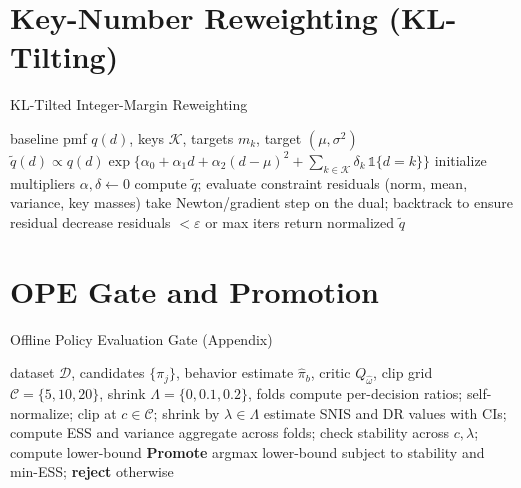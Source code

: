 \section{Key-Number Reweighting (KL-Tilting)}
\begin{algorithm}[H]
  \caption{KL-Tilted Integer-Margin Reweighting}
  \label{alg:kl-tilt}
  \begin{algorithmic}[1]
    \Require baseline pmf $q(d)$, keys $\mathcal K$, targets $m_k$, target $(\mu,\sigma^2)$
    \Ensure $\tilde q(d) \propto q(d)\exp\{\alpha_0+\alpha_1 d+\alpha_2 (d-\mu)^2+\sum_{k\in\mathcal K}\delta_k\,\mathbb{1}\{d=k\}\}$
    \State initialize multipliers $\alpha,\delta \leftarrow 0$
    \Repeat
      \State compute $\tilde q$; evaluate constraint residuals (norm, mean, variance, key masses)
      \State take Newton/gradient step on the dual; backtrack to ensure residual decrease
    \Until residuals $< \varepsilon$ or max iters
    \State return normalized $\tilde q$
  \end{algorithmic}
\end{algorithm}

\section{OPE Gate and Promotion}
\begin{algorithm}[H]
  \caption{Offline Policy Evaluation Gate (Appendix)}
  \label{alg:ope-gate-appendix}
  \begin{algorithmic}[1]
    \Require dataset $\mathcal D$, candidates $\{\pi_j\}$, behavior estimate $\hat\pi_b$, critic $Q_{\hat\omega}$, clip grid $\mathcal C=\{5,10,20\}$, shrink $\Lambda=\{0,0.1,0.2\}$, folds
        \State compute per-decision ratios; self-normalize; clip at $c\in \mathcal C$; shrink by $\lambda\in\Lambda$
        \State estimate SNIS and DR values with CIs; compute ESS and variance
      \EndFor
      \State aggregate across folds; check stability across $c,\lambda$; compute lower-bound
    \EndFor
    \State \textbf{Promote} argmax lower-bound subject to stability and min-ESS; \textbf{reject} otherwise
  \end{algorithmic}
\end{algorithm}

